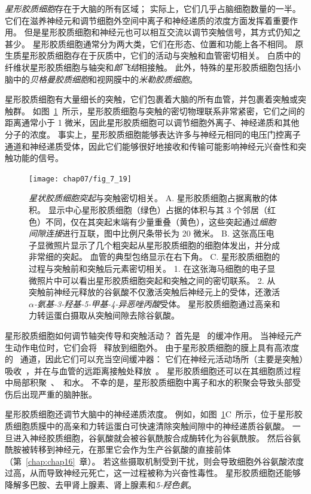 \textit{星形胶质细胞}存在于大脑的所有区域；
实际上，它们几乎占脑细胞数量的一半。
它们在滋养神经元和调节细胞外空间中离子和神经递质的浓度方面发挥着重要作用。
但是星形胶质细胞和神经元也可以相互交流以调节突触信号，其方式仍知之甚少。
星形胶质细胞通常分为两大类，它们在形态、位置和功能上各不相同。
原生质星形胶质细胞存在于灰质中，它们的活动与突触和血管密切相关。
白质中的纤维状星形胶质细胞与轴突和\textit{郎飞结}相接触。
此外，特殊的星形胶质细胞包括小脑中的\textit{贝格曼胶质细胞}和视网膜中的\textit{米勒胶质细胞}。


星形胶质细胞有大量细长的突触，它们包裹着大脑的所有血管，并包裹着突触或突触群。
如图~\ref{fig:7_19}~所示，星形胶质细胞与突触的密切物理联系非常紧密，它们之间的距离通常小于 1 微米，因此星形胶质细胞可以调节细胞外离子、神经递质和其他分子的浓度。
事实上，星形胶质细胞能够表达许多与神经元相同的电压门控离子通道和神经递质受体，因此它们能够很好地接收和传输可能影响神经元兴奋性和突触功能的信号。


\begin{figure}[htbp]
	\centering
	\texttt{[image: chap07/fig\_7\_19]}
	\caption{\textit{星状胶质细胞突起}与突触密切相关。
		A. 星形胶质细胞占据离散的体积。
		显示中心星形胶质细胞（绿色）占据的体积与其 3 个邻居（红色）不同，仅在其突起末端有少量重叠（黄色），这些突起通过\textit{细胞间隙连接}进行互联，图中比例尺条带长为 20 微米\cite{bushong2002protoplasmic}。
		B. 这张高压电子显微照片显示了几个粗突起从星形胶质细胞的细胞体发出，并分成非常细的突起。
		血管的典型包络显示在右下角\cite{hama1994three}。
		C. 星形胶质细胞的过程与突触前和突触后元素密切相关。
		1. 在这张海马细胞的电子显微照片中可以看出星形胶质细胞突起和突触之间的密切联系\cite{ventura1999three}。
		2. 从突触前神经元释放的谷氨酸不仅激活突触后神经元上的受体，还激活\textit{$\alpha$-氨基-3-羟基-5-甲基-4-异恶唑丙酸}受体。
		星形胶质细胞通过高亲和力转运蛋白摄取从突触间隙去除谷氨酸\cite{gallo2001unwrapping}。}
	\label{fig:7_19}
\end{figure}


星形胶质细胞如何调节轴突传导和突触活动？
首先是~ 的缓冲作用。
当神经元产生动作电位时，它们会将~ 释放到细胞外。
由于星形胶质细胞的膜上具有高浓度的~ 通道，因此它们可以充当空间缓冲器：
它们在神经元活动场所（主要是突触）吸收~，并在与血管的远距离接触处释放~。
星形胶质细胞还可以在其细胞质过程中局部积聚~、~和水。
不幸的是，星形胶质细胞中离子和水的积聚会导致头部受伤后出现严重的脑肿胀。


星形胶质细胞还调节大脑中的神经递质浓度。
例如，如图~\ref{fig:7_19}C~所示，位于星形胶质细胞质膜中的高亲和力转运蛋白可快速清除突触间隙中的神经递质谷氨酸。
一旦进入神经胶质细胞，谷氨酸就会被谷氨酰胺合成酶转化为谷氨酰胺。
然后谷氨酰胺被转移到神经元，在那里它会作为生产谷氨酸的直接前体（第~\ref{chap:chap16}~章）。
若这些摄取机制受到干扰，则会导致细胞外谷氨酸浓度过高，从而导致神经元死亡，这一过程被称为兴奋性毒性。
星形胶质细胞还能够降解多巴胺、去甲肾上腺素、肾上腺素和\textit{5-羟色氨}。


